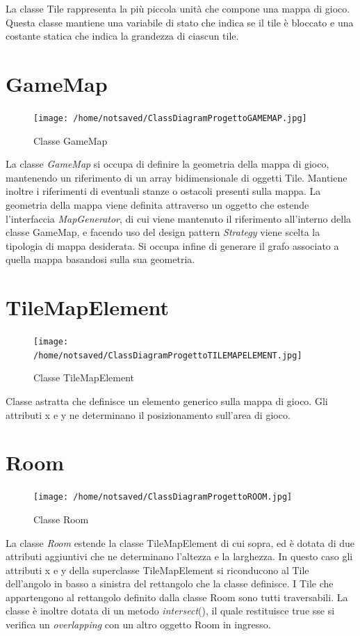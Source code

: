 \documentclass[11pt]{book}
\begin{document}
La classe Tile rappresenta la pi\`u piccola unit\`a che compone una mappa di gioco. Questa classe mantiene una variabile di stato che indica se il tile \`e bloccato e una costante statica che indica la grandezza di ciascun tile.

\section{GameMap}
\begin{figure}[H]
\centering
\texttt{[image: /home/notsaved/ClassDiagramProgettoGAMEMAP.jpg]}
\caption{Classe GameMap}
\label{gamemap}
\end{figure}

La classe \emph{GameMap} si occupa di definire la geometria della mappa di gioco, mantenendo un riferimento di un array bidimensionale di oggetti Tile. Mantiene inoltre i riferimenti di eventuali stanze o ostacoli presenti sulla mappa. La geometria della mappa viene definita attraverso un oggetto che estende l'interfaccia \emph{MapGenerator}, di cui viene mantenuto il riferimento all'interno della classe GameMap, e facendo uso del design pattern \emph{Strategy} viene scelta la tipologia di mappa desiderata. Si occupa infine di generare il grafo associato a quella mappa basandosi sulla sua geometria.

\section{TileMapElement}
\begin{figure}[H]
\centering
\texttt{[image: /home/notsaved/ClassDiagramProgettoTILEMAPELEMENT.jpg]}
\caption{Classe TileMapElement}
\label{tilemapelement}
\end{figure}

Classe astratta che definisce un elemento generico sulla mappa di gioco. Gli attributi x e y ne determinano il posizionamento sull'area di gioco.

\section{Room}

\begin{figure}[H]
\centering
\texttt{[image: /home/notsaved/ClassDiagramProgettoROOM.jpg]}
\caption{Classe Room}
\label{classroom}
\end{figure}

La classe \emph{Room} estende la classe TileMapElement di cui sopra, ed \`e dotata di due attributi aggiuntivi che ne determinano l'altezza e la larghezza. In questo caso gli attributi x e y della superclasse TileMapElement si riconducono al Tile dell'angolo in basso a sinistra del rettangolo che la classe definisce. I Tile che appartengono al rettangolo definito dalla classe Room sono tutti traversabili. La classe \`e inoltre dotata di un metodo \emph{intersect}(), il quale restituisce true sse si verifica un \emph{overlapping} con un altro oggetto Room in ingresso.
\end{document}
